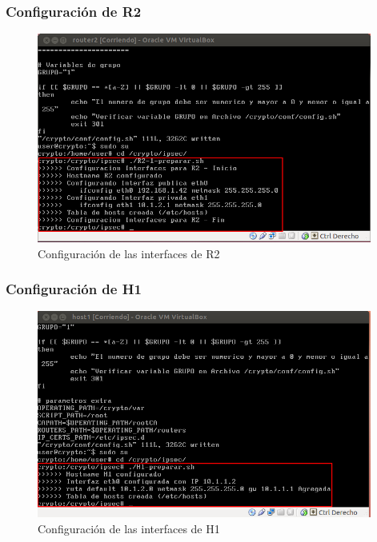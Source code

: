 \documentclass[a4paper,10pt]{article}
\begin{document}
			\subsubsection{Configuraci\'on de R2}
	\begin{figure}[H]
		\centering
		\includegraphics[width=11cm]{Imagenes/prepararR2.png}
		\caption{Configuraci\'on de las interfaces de R2} \label{img015}
	\end{figure}	

			\subsubsection{Configuraci\'on de H1}
	\begin{figure}[H]
		\centering
		\includegraphics[width=11cm]{Imagenes/prepararH1.png}
		\caption{Configuraci\'on de las interfaces de H1} \label{img016}
	\end{figure}	
\end{document}
